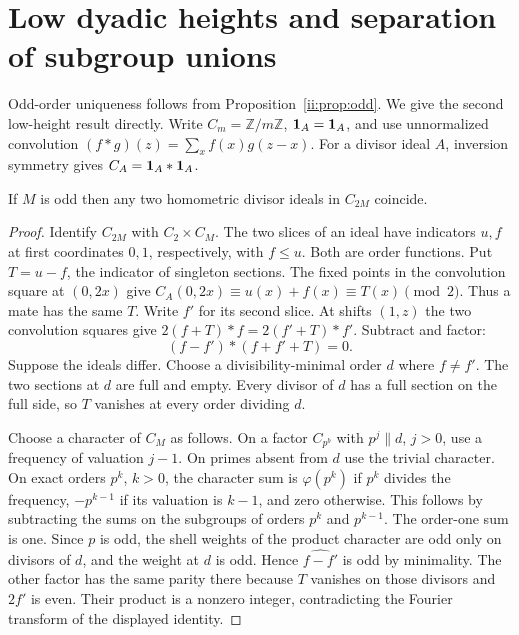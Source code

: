 \section{Low dyadic heights and separation of subgroup unions}
Odd-order uniqueness follows from Proposition~\ref{ii:prop:odd}. We give the second low-height result directly. Write $C_m=\mathbb Z/m\mathbb Z$, $\mathbf1_A=\mathbf1_A$, and use unnormalized convolution $(f*g)(z)=\sum_x f(x)g(z-x)$. For a divisor ideal $A$, inversion symmetry gives $C_A=\mathbf1_A*\mathbf1_A$.
\begin{proposition}\label{vi:prop:twice}
If $M$ is odd then any two homometric divisor ideals in $C_{2M}$ coincide.
\end{proposition}
\begin{proof}
Identify $C_{2M}$ with $C_2\times C_M$. The two slices of an ideal have indicators $u,f$ at first coordinates $0,1$, respectively, with $f\le u$. Both are order functions. Put $T=u-f$, the indicator of singleton sections. The fixed points in the convolution square at $(0,2x)$ give $C_A(0,2x)\equiv u(x)+f(x)\equiv T(x)\pmod 2$. Thus a mate has the same $T$. Write $f'$ for its second slice. At shifts $(1,z)$ the two convolution squares give $2(f+T)*f=2(f'+T)*f'$. Subtract and factor:
\[
 (f-f')*(f+f'+T)=0.
\]
Suppose the ideals differ. Choose a divisibility-minimal order $d$ where $f\ne f'$. The two sections at $d$ are full and empty. Every divisor of $d$ has a full section on the full side, so $T$ vanishes at every order dividing $d$.

Choose a character of $C_M$ as follows. On a factor $C_{p^b}$ with $p^j\parallel d$, $j>0$, use a frequency of valuation $j-1$. On primes absent from $d$ use the trivial character. On exact orders $p^k$, $k>0$, the character sum is $\varphi(p^k)$ if $p^k$ divides the frequency, $-p^{k-1}$ if its valuation is $k-1$, and zero otherwise. This follows by subtracting the sums on the subgroups of orders $p^k$ and $p^{k-1}$. The order-one sum is one. Since $p$ is odd, the shell weights of the product character are odd only on divisors of $d$, and the weight at $d$ is odd. Hence $\widehat{f-f'}$ is odd by minimality. The other factor has the same parity there because $T$ vanishes on those divisors and $2f'$ is even. Their product is a nonzero integer, contradicting the Fourier transform of the displayed identity.
\end{proof}

